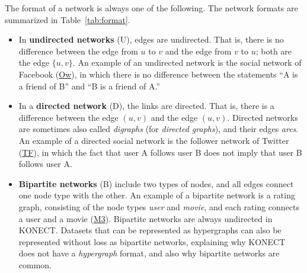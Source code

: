 \documentclass{article}
\begin{document}
The format of a network is always one of the following.  The network
formats are summarized in Table~\ref{tab:format}. 
\begin{itemize}
\item 
  In \textbf{undirected networks} (U), 
  edges are undirected.  That is,
  there is no difference between the edge from $u$ to $v$ and the edge
  from $v$ to $u$; both are the edge $\{u,v\}$. 
  An example of an undirected network is the social network of
  Facebook
  (\href{http://konect.cc/networks/facebook-wosn-wall/}{\textsf{Ow}}),
  in which there is no difference between the statements ``A 
  is a friend of B'' and ``B is a friend of A.''
\item In a \textbf{directed network} (D), 
  the links are directed. That is, there is a
  difference between the edge $(u,v)$ and the edge $(u,v)$. 
  Directed networks are sometimes also called \emph{digraphs} (for \emph{directed
    graphs}), and their edges \emph{arcs}. 
  An example of a directed social network is the follower network of
  Twitter
  (\href{http://konect.cc/networks/twitter_mpi/}{\textsf{TF}}),
  in which the fact that user A follows user B does not imply 
  that user B follows user A. 
\item \textbf{Bipartite networks} (B) 
  include two types of nodes, and all edges
  connect one node type with the other. An example of a bipartite
  network is a rating graph, consisting of the node types \emph{user}
  and \emph{movie}, and each rating connects a user and a movie
  (\href{http://konect.cc/networks/movielens-10m_rating/}{\textsf{M3}}).  
  Bipartite networks are always undirected in KONECT.  Datasets that can
  be represented as hypergraphs can also be represented without loss as
  bipartite networks, explaining why KONECT does not have a
  \emph{hypergraph} format, and also why bipartite networks are common. 
\end{itemize}

\begin{table}
  \caption{
    The network formats allowed in KONECT.
    Each network dataset is exactly of one type.  
    \label{tab:format}
  }
  \centering
{}
\end{table}
\end{document}
